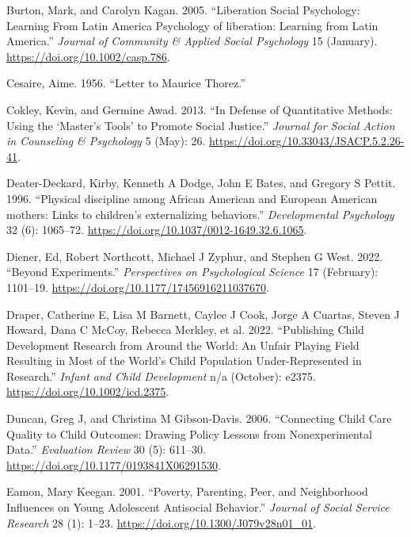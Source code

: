 \documentclass[
  letterpaper,
  DIV=11,
  numbers=noendperiod]{scrreprt}
\newlength{\cslhangindent}
\newlength{\cslentryspacingunit} %
\newenvironment{CSLReferences}[2] %
 {%
  \setlength{\parindent}{0pt}
  \ifodd #1
  \let\oldpar\par
  \def\par{\hangindent=\cslhangindent\oldpar}
  \fi
  \setlength{\parskip}{#2\cslentryspacingunit}
 }%
 {}
\begin{document}
\begin{CSLReferences}{1}{0}
\leavevmode{}%
Burton, Mark, and Carolyn Kagan. 2005. {``{Liberation Social Psychology:
Learning From Latin America Psychology of liberation: Learning from
Latin America}.''} \emph{Journal of Community \& Applied Social
Psychology} 15 (January). \url{https://doi.org/10.1002/casp.786}.

\leavevmode{}%
Cesaire, Aime. 1956. {``Letter to {M}aurice {T}horez.''}

\leavevmode{}%
Cokley, Kevin, and Germine Awad. 2013. {``In Defense of Quantitative
Methods: Using the {`Master's Tools'} to Promote Social Justice.''}
\emph{Journal for Social Action in Counseling \& Psychology} 5 (May):
26. \url{https://doi.org/10.33043/JSACP.5.2.26-41}.

\leavevmode{}%
Deater-Deckard, Kirby, Kenneth A Dodge, John E Bates, and Gregory S
Pettit. 1996. {``{Physical discipline among African American and
European American mothers: Links to children's externalizing
behaviors.}''} \emph{Developmental Psychology} 32 (6): 1065--72.
\url{https://doi.org/10.1037/0012-1649.32.6.1065}.

\leavevmode{}%
Diener, Ed, Robert Northcott, Michael J Zyphur, and Stephen G West.
2022. {``Beyond Experiments.''} \emph{Perspectives on Psychological
Science} 17 (February): 1101--19.
\url{https://doi.org/10.1177/17456916211037670}.

\leavevmode{}%
Draper, Catherine E, Lisa M Barnett, Caylee J Cook, Jorge A Cuartas,
Steven J Howard, Dana C McCoy, Rebecca Merkley, et al. 2022.
{``Publishing Child Development Research from Around the World: An
Unfair Playing Field Resulting in Most of the World's Child Population
Under-Represented in Research.''} \emph{Infant and Child Development}
n/a (October): e2375. \url{https://doi.org/10.1002/icd.2375}.

\leavevmode{}%
Duncan, Greg J, and Christina M Gibson-Davis. 2006. {``{Connecting Child
Care Quality to Child Outcomes: Drawing Policy Lessons from
Nonexperimental Data}.''} \emph{Evaluation Review} 30 (5): 611--30.
\url{https://doi.org/10.1177/0193841X06291530}.

\leavevmode{}%
Eamon, Mary Keegan. 2001. {``{Poverty, Parenting, Peer, and Neighborhood
Influences on Young Adolescent Antisocial Behavior}.''} \emph{Journal of
Social Service Research} 28 (1): 1--23.
\url{https://doi.org/10.1300/J079v28n01_01}.


\end{CSLReferences}
\end{document}
